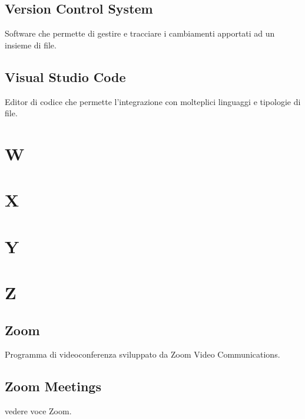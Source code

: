 \subsection{Version Control System}
Software che permette di gestire e tracciare i cambiamenti apportati ad un insieme di file.
\subsection{Visual Studio Code}
Editor di codice che permette l'integrazione con molteplici linguaggi e tipologie di file.
\newpage
\section{W}
\section{X}
\section{Y}
\section{Z}
\subsection{Zoom}
Programma di videoconferenza sviluppato da Zoom Video Communications.
\subsection{Zoom Meetings}
vedere voce Zoom.

